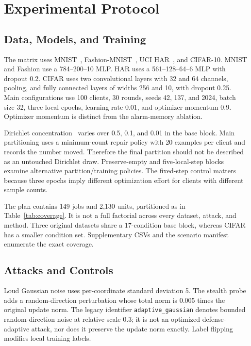 \documentclass[journal]{IEEEtran}
\begin{document}
\section{Experimental Protocol}

\subsection{Data, Models, and Training}
The matrix uses MNIST~\cite{lecun1998}, Fashion-MNIST~\cite{xiao2017fmnist}, UCI HAR~\cite{anguita2013har}, and CIFAR-10. MNIST and Fashion use a 784--200--10 MLP. HAR uses a 561--128--64--6 MLP with dropout 0.2. CIFAR uses two convolutional layers with 32 and 64 channels, pooling, and fully connected layers of widths 256 and 10, with dropout 0.25. Main configurations use 100 clients, 30 rounds, seeds 42, 137, and 2024, batch size 32, three local epochs, learning rate 0.01, and optimizer momentum 0.9. Optimizer momentum is distinct from the alarm-memory ablation.

Dirichlet concentration~\cite{hsu2019} varies over 0.5, 0.1, and 0.01 in the base block. Main partitioning uses a minimum-count repair policy with 20 examples per client and records the number moved. Therefore the final partition should not be described as an untouched Dirichlet draw. Preserve-empty and five-local-step blocks examine alternative partition/training policies. The fixed-step control matters because three epochs imply different optimization effort for clients with different sample counts.

The plan contains 149 jobs and 2,130 units, partitioned as in Table~\ref{tab:coverage}. It is not a full factorial across every dataset, attack, and method. Three original datasets share a 17-condition base block, whereas CIFAR has a smaller condition set. Supplementary CSVs and the scenario manifest enumerate the exact coverage.

\subsection{Attacks and Controls}
Loud Gaussian noise uses per-coordinate standard deviation 5. The stealth probe adds a random-direction perturbation whose total norm is 0.005 times the original update norm. The legacy identifier \texttt{adaptive\_gaussian} denotes bounded random-direction noise at relative scale 0.3; it is not an optimized defense-adaptive attack, nor does it preserve the update norm exactly. Label flipping modifies local training labels.
\end{document}

